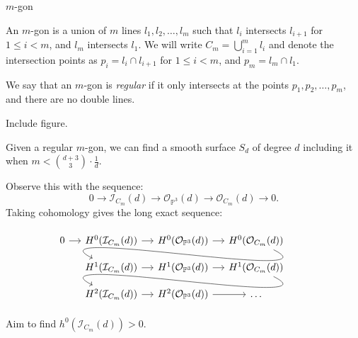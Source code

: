 \documentclass[UKenglish,aspectratio=169]{beamer}
\begin{document}
\begin{frame}[fragile]{$m$-gon}
    \begin{definition}
        An $m$-gon is a union of $m$ lines $l_1, l_2, \dots, l_m$ such that $l_i$ intersects $l_{i+1}$ for $1 \leq i < m$, and $l_m$ intersects $l_1$. We will write $C_m = \bigcup_{i=1}^m l_i$ and denote the intersection points as $p_i = l_i \cap l_{i+1}$ for $1 \leq i < m$, and $p_m = l_m \cap l_1$.
    \end{definition}
    We say that an $m$-gon is \emph{regular} if it only intersects at the points $p_1, p_2, \dots, p_m$, and there are no double lines. 

    Include figure.
\end{frame}


\begin{frame}[fragile]
        \begin{theorem}
        Given a regular $m$-gon, we can find a smooth surface $S_d$ of degree $d$ including it when $m < \binom{d+3}{3}\cdot \frac{1}{d}$.
    \end{theorem}
    
    Observe this with the sequence:
    \[0 \to \mathcal{I}_{C_m}(d) \to \mathcal{O}_{\mathbb{P}^3}(d) \to \mathcal{O}_{C_m}(d) \to 0.\]
    Taking cohomology gives the long exact sequence:
    \[
        \begin{tikzcd}[sep=small]
        0 \ar[r]
        & H^0(\mathcal{I}_{C_m}(d)) \ar[r]
        & H^0(\mathcal{O}_{\mathbb{P}^3}(d)) \ar[r]
        & H^0(\mathcal{O}_{C_m}(d)) \ar[controls={+(3,-1.5) and +(-3,1.5)}]{dll} \\
        {}
        & H^1(\mathcal{I}_{C_m}(d)) \ar[r]
        & H^1(\mathcal{O}_{\mathbb{P}^3}(d)) \ar[r]
        & H^1(\mathcal{O}_{C_m}(d)) \ar[controls={+(3,-1.5) and +(-3,1.5)}]{dll} \\
        {}
        & H^2(\mathcal{I}_{C_m}(d)) \ar[r]
        & H^2(\mathcal{O}_{\mathbb{P}^3}(d)) \ar[r]
        & \dots
        \end{tikzcd}
    \]
    Aim to find $h^0(\mathcal{I}_{C_m}(d)) > 0$.
\end{frame}
\end{document}
